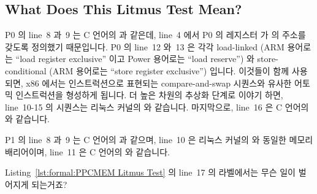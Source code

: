 \subsection{What Does This Litmus Test Mean?}
\label{sec:formal:What Does This Litmus Test Mean?}

P0 의 line~8 과~9 는 C 언어의  과 같은데, line~4 에서 P0 의 레지스터
 가  의 주소를 갖도록 정의했기 때문입니다.
P0 의 line~12 와~13 은 각각 load-linked (ARM 용어로는 ``load register
exclusive'' 이고 Power 용어로는 ``load reserve'') 와 store-conditional (ARM
용어로는 ``store register exclusive'') 입니다.
이것들이 함께 사용되면, x86 에서는  인스트럭션으로 표현되는
compare-and-swap 시퀀스와 유사한 어토믹 인스트럭션을 형성하게 됩니다.
더 높은 차원의 추상화 단계로 이야기 하면, line~10-15 의 시퀀스는 리눅스 커널의
 와 같습니다.
마지막으로, line~16 은 C 언어의  와 같습니다.

P1 의 line~8 과~9 는 C 언어의  과 같으며, line~10 은 리눅스 커널의
 와 동일한 메모리 배리어이며, line~11 은 C 언어의  와
같습니다.
\iffalse

P0's lines~8 and~9 are equivalent to the C statement \co{x=1} because
line~4 defines P0's register \co{r2} to be the address of \co{x}. P0's
lines~12 and~13 are the mnemonics for load-linked (``load register
exclusive'' in ARM parlance and ``load reserve'' in Power parlance)
and store-conditional (``store register exclusive'' in ARM parlance),
respectively. When these are used together, they form an atomic
instruction sequence, roughly similar to the compare-and-swap sequences
exemplified by the x86 \co{lock;cmpxchg} instruction. Moving to a higher
level of abstraction, the sequence from lines~10-15 is equivalent to
the Linux kernel's \co{atomic_add_return(&z, 0)}. Finally, line~16 is
roughly equivalent to the C statement \co{r3=y}.

P1's lines~8 and~9 are equivalent to the C statement \co{y=1}, line~10
is a memory barrier, equivalent to the Linux kernel statement \co{smp_mb()},
and line~11 is equivalent to the C statement \co{r3=x}.
\fi

\QuickQuiz{}
	Listing~\ref{lst:formal:PPCMEM Litmus Test} 의 line~17 의 
	라벨에서는 무슨 일이 벌어지게 되는거죠?
	\iffalse

